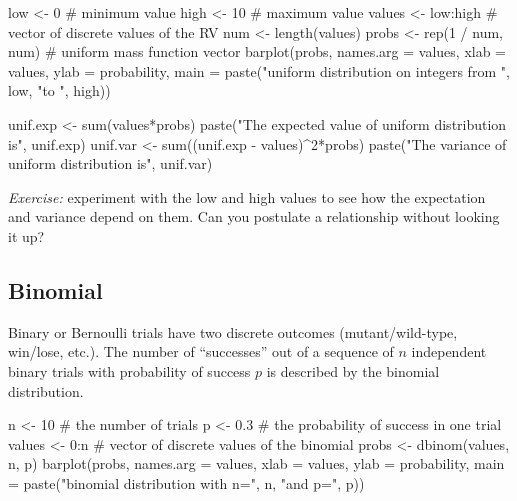 \documentclass[
  letterpaper,
  DIV=11,
  numbers=noendperiod]{scrreprt}
\newenvironment{Shaded}{\begin{snugshade}}{\end{snugshade}}
\newcommand{\NormalTok}[1]{\textcolor[rgb]{0.00,0.23,0.31}{#1}}
\begin{document}
\begin{Shaded}
\begin{Highlighting}[]
\NormalTok{low \textless{}{-} 0 \# minimum value}
\NormalTok{high \textless{}{-} 10 \# maximum value}
\NormalTok{values \textless{}{-} low:high \# vector of discrete values of the RV}
\NormalTok{num \textless{}{-} length(values)}
\NormalTok{probs \textless{}{-} rep(1 / num, num) \# uniform mass function vector}
\NormalTok{barplot(probs, names.arg = values, xlab = \textquotesingle{}values\textquotesingle{}, ylab = \textquotesingle{}probability\textquotesingle{},}
\NormalTok{        main = paste("uniform  distribution on integers from ", low, "to ", high))}
\end{Highlighting}
\end{Shaded}

\begin{Shaded}
\begin{Highlighting}[]
\NormalTok{unif.exp \textless{}{-} sum(values*probs)}
\NormalTok{paste("The expected value of uniform distribution is", unif.exp)}
\NormalTok{unif.var \textless{}{-} sum((unif.exp {-} values)\^{}2*probs)}
\NormalTok{paste("The variance of uniform distribution is", unif.var)}
\end{Highlighting}
\end{Shaded}

\emph{Exercise:} experiment with the low and high values to see how the
expectation and variance depend on them. Can you postulate a
relationship without looking it up?

\subsection{Binomial}\label{binomial}

Binary or Bernoulli trials have two discrete outcomes (mutant/wild-type,
win/lose, etc.). The number of ``successes'' out of a sequence of \(n\)
independent binary trials with probability of success \(p\) is described
by the binomial distribution.

\begin{Shaded}
\begin{Highlighting}[]
\NormalTok{n \textless{}{-} 10 \# the number of trials}
\NormalTok{p \textless{}{-} 0.3 \# the probability of success in one trial}
\NormalTok{values \textless{}{-} 0:n \# vector of discrete values of the binomial}
\NormalTok{probs \textless{}{-} dbinom(values, n, p)}
\NormalTok{barplot(probs, names.arg = values, xlab = \textquotesingle{}values\textquotesingle{}, ylab = \textquotesingle{}probability\textquotesingle{},}
\NormalTok{        main = paste("binomial distribution with n=", n, "and p=", p))}
\end{Highlighting}
\end{Shaded}
\end{document}
